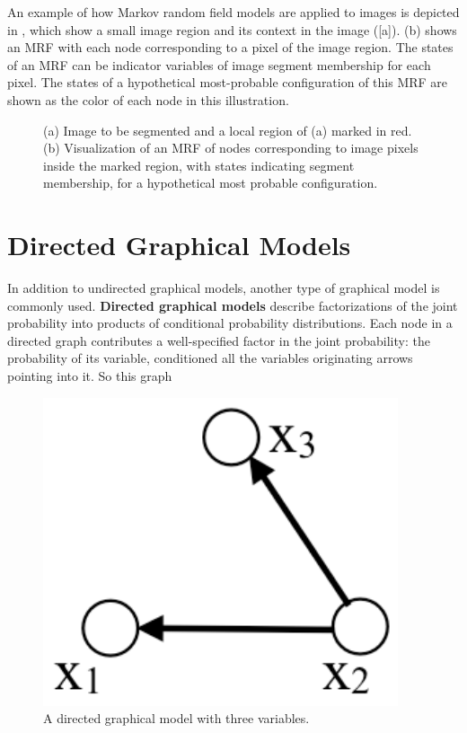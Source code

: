 An example of how Markov random field models are applied to images is depicted in \fig{\ref{fig:leafs}}, which show a small image region and its context in the image (\fig{\ref{fig:leafs}}[a]). \Fig{\ref{fig:leafs}}(b) shows an MRF with each node corresponding to a pixel of the image region.  The states of an MRF can be indicator variables of image segment membership for each pixel. The states of a hypothetical most-probable configuration of this MRF are shown as the color of each node in this illustration.


\begin{figure}
\centerline{
}
\caption{(a) Image to be segmented and a local region of (a) marked in red.  (b) Visualization of an MRF of nodes corresponding to image pixels inside the marked region, with states indicating segment membership, for a hypothetical most probable configuration.}
\label{fig:leafs}
\end{figure}


\section{Directed Graphical Models}


In addition to undirected graphical models, another
type of graphical  model is commonly used.
{\bf Directed graphical models} \cite{Koller2009} describe factorizations of the joint
probability into products of conditional probability distributions.  
Each node in a directed graph contributes a
well-specified factor in the joint probability:  the probability of
its variable, conditioned all the variables originating arrows
pointing into it.  So this graph
\begin{figure}
\centerline{\includegraphics[width=0.20\linewidth]{figures/graphical_models/directed.pdf}} 
\caption{A directed graphical model with three variables.}
\end{figure}

